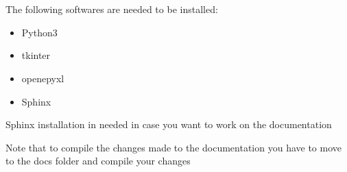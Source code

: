 \documentclass[letterpaper,10pt,english]{sphinxmanual}
\begin{document}
\section{}
\label{\detokenize{developer:software-requirements}}
The following softwares are needed to be installed:
\begin{itemize}
\item {} 
Python3

\end{itemize}
\begin{itemize}
\item {} 
tkinter

\item {} 
openepyxl

\end{itemize}
\begin{itemize}
\item {} 
Sphinx

\end{itemize}

\begin{sphinxVerbatim}[commandchars=\\\{\}]
   
   
  
  
  
  
  
  
  
  
\end{sphinxVerbatim}

Sphinx installation in needed in case you want to work on the documentation

\begin{sphinxVerbatim}[commandchars=\\\{\}]
  
\end{sphinxVerbatim}

Note that to compile the changes made to the documentation you have to move to the docs folder and compile your changes

\begin{sphinxVerbatim}[commandchars=\\\{\}]
 
 
\end{sphinxVerbatim}
\end{document}
